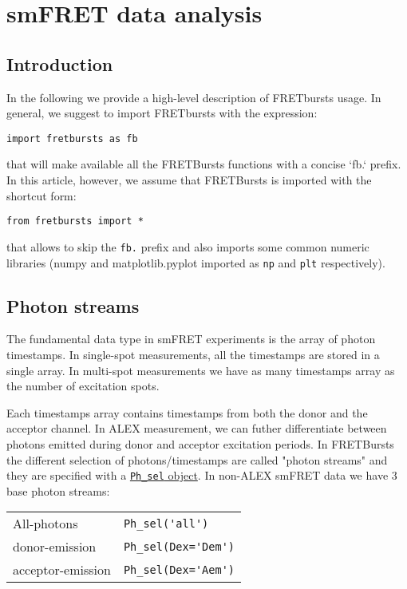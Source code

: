 \section{smFRET data analysis}

\subsection{Introduction}

In the following we provide a high-level description of FRETbursts usage. In general, we suggest to import FRETbursts with the expression:

\verb|import fretbursts as fb|

that will make available all the FRETBursts functions with a concise `fb.` prefix. In this article, however, we assume that FRETBursts is imported with the shortcut form:

\verb|from fretbursts import *|

that allows to skip the \verb|fb.| prefix and also imports some common numeric libraries (numpy and matplotlib.pyplot imported as \verb|np| and \verb|plt| respectively).

\subsection{Photon streams}

The fundamental data type in smFRET experiments is the array of photon timestamps. In single-spot measurements, all the timestamps are stored in a single array. In multi-spot measurements we have as many timestamps array as the number of excitation spots.

Each timestamps array contains timestamps from both the donor and the acceptor channel. In ALEX measurement, we can futher differentiate between photons emitted during donor and acceptor excitation periods. In FRETBursts the different selection of photons/timestamps are called "photon streams" and they are specified with a \href{http://fretbursts.readthedocs.org/en/latest/data_class.html#module-fretbursts.ph_sel}{\verb|Ph_sel| object}. In non-ALEX smFRET data we have 3 base photon streams: 

\begin{tabular}{l l}
  All-photons       & \verb|Ph_sel('all')|\\
  donor-emission    & \verb|Ph_sel(Dex='Dem')|\\
  acceptor-emission & \verb|Ph_sel(Dex='Aem')|\\
\end{tabular}


